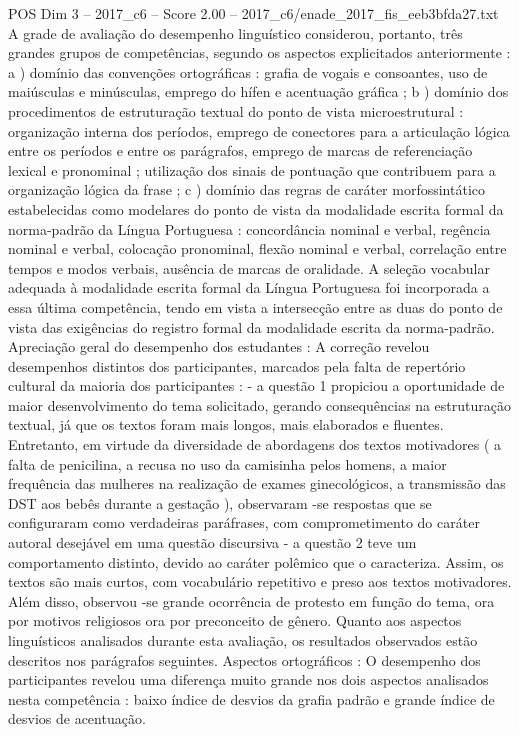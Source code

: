 \begin{textsample}{POS Dim 3 – 2017\_c6 – Score 2.00 – 2017\_c6/enade\_2017\_fis\_eeb3bfda27.txt}
A grade de avaliação do desempenho linguístico considerou, portanto, três grandes grupos de competências, segundo os aspectos explicitados anteriormente : a ) domínio das convenções ortográficas : grafia de vogais e consoantes, uso de maiúsculas e minúsculas, emprego do hífen e acentuação gráfica ; b ) domínio dos procedimentos de estruturação textual do ponto de vista microestrutural : organização interna dos períodos, emprego de conectores para a articulação lógica entre os períodos e entre os parágrafos, emprego de marcas de referenciação lexical e pronominal ; utilização dos sinais de pontuação que contribuem para a organização lógica da frase ; c ) domínio das regras de caráter morfossintático estabelecidas como modelares do ponto de vista da modalidade escrita formal da norma-padrão da Língua Portuguesa : concordância nominal e verbal, regência nominal e verbal, colocação pronominal, flexão nominal e verbal, correlação entre tempos e modos verbais, ausência de marcas de oralidade.
A seleção vocabular adequada à modalidade escrita formal da Língua Portuguesa foi incorporada a essa última competência, tendo em vista a intersecção entre as duas do ponto de vista das exigências do registro formal da modalidade escrita da norma-padrão.
Apreciação geral do desempenho dos estudantes : A correção revelou desempenhos distintos dos participantes, marcados pela falta de repertório cultural da maioria dos participantes : - a questão 1 propiciou a oportunidade de maior desenvolvimento do tema solicitado, gerando consequências na estruturação textual, já que os textos foram mais longos, mais elaborados e fluentes.
Entretanto, em virtude da diversidade de abordagens dos textos motivadores ( a falta de penicilina, a recusa no uso da camisinha pelos homens, a maior frequência das mulheres na realização de exames ginecológicos, a transmissão das DST aos bebês durante a gestação ), observaram -se respostas que se configuraram como verdadeiras paráfrases, com comprometimento do caráter autoral desejável em uma questão discursiva - a questão 2 teve um comportamento distinto, devido ao caráter polêmico que o caracteriza.
Assim, os textos são mais curtos, com vocabulário repetitivo e preso aos textos motivadores.
Além disso, observou -se grande ocorrência de protesto em função do tema, ora por motivos religiosos ora por preconceito de gênero.
Quanto aos aspectos linguísticos analisados durante esta avaliação, os resultados observados estão descritos nos parágrafos seguintes.
Aspectos ortográficos : O desempenho dos participantes revelou uma diferença muito grande nos dois aspectos analisados nesta competência : baixo índice de desvios da grafia padrão e grande índice de desvios de acentuação.

\end{textsample}
